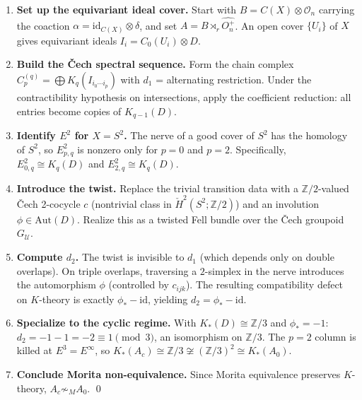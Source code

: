 \documentclass[11pt,a4paper]{article}
\theoremstyle{plain}
\theoremstyle{definition}
\theoremstyle{remark}
\begin{document}
\begin{enumerate}[label=\textbf{Step \arabic*.}, leftmargin=2.5em]
  \item \textbf{Set up the equivariant ideal cover.}
    Start with $B = C(X) \otimes \mathcal{O}_n$ carrying the coaction $\alpha = \mathrm{id}_{C(X)} \otimes \delta$, and set $A = B \rtimes_r \widehat{O_n^+}$.
    An open cover $\{U_i\}$ of $X$ gives equivariant ideals $I_i = C_0(U_i) \otimes D$.

  \item \textbf{Build the \v{C}ech spectral sequence.}
    Form the chain complex $C^{(q)}_p = \bigoplus K_q(I_{i_0 \cdots i_p})$ with $d_1$ = alternating restriction.
    Under the contractibility hypothesis on intersections, apply the coefficient reduction: all entries become copies of $K_{q-1}(D)$.

  \item \textbf{Identify $E^2$ for $X = S^2$.}
    The nerve of a good cover of $S^2$ has the homology of $S^2$, so $E^2_{p,q}$ is nonzero only for $p = 0$ and $p = 2$.
    Specifically, $E^2_{0,q} \cong K_q(D)$ and $E^2_{2,q} \cong K_q(D)$.

  \item \textbf{Introduce the twist.}
    Replace the trivial transition data with a $\mathbb{Z}/2$-valued \v{C}ech 2-cocycle $c$ (nontrivial class in $\check{H}^2(S^2;\mathbb{Z}/2)$) and an involution $\phi \in \mathrm{Aut}(D)$.
    Realize this as a twisted Fell bundle over the \v{C}ech groupoid $G_{\mathcal{U}}$.

  \item \textbf{Compute $d_2$.}
    The twist is invisible to $d_1$ (which depends only on double overlaps).
    On triple overlaps, traversing a $2$-simplex in the nerve introduces the automorphism $\phi$ (controlled by $c_{ijk}$).
    The resulting compatibility defect on $K$-theory is exactly $\phi_* - \mathrm{id}$, yielding $d_2 = \phi_* - \mathrm{id}$.

  \item \textbf{Specialize to the cyclic regime.}
    With $K_*(D) \cong \mathbb{Z}/3$ and $\phi_* = -1$:
    $d_2 = -1 - 1 = -2 \equiv 1 \pmod{3}$, an isomorphism on $\mathbb{Z}/3$.
    The $p = 2$ column is killed at $E^3 = E^\infty$, so
    $K_*(A_c) \cong \mathbb{Z}/3 \not\cong (\mathbb{Z}/3)^2 \cong K_*(A_0)$.

  \item \textbf{Conclude Morita non-equivalence.}
    Since Morita equivalence preserves $K$-theory, $A_c \not\sim_M A_0$. \qed
\end{enumerate}
\end{document}
